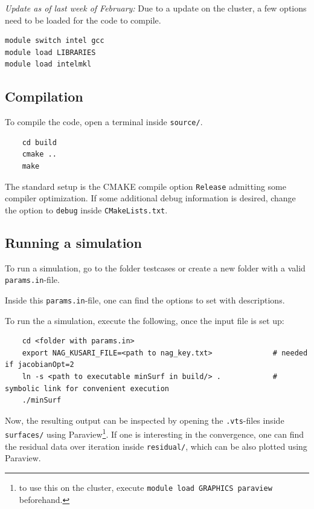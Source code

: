 \documentclass[11pt]{scrartcl}
\begin{document}
\color{@darkred}
\emph{Update as of last week of February:} Due to a update on the cluster, a few options need to be loaded for the code to compile.
\begin{lstlisting}
module switch intel gcc 
module load LIBRARIES
module load intelmkl
\end{lstlisting}
\normalcolor

\subsection{Compilation}
To compile the code, open a terminal inside \texttt{source/}. 
\begin{lstlisting}
	cd build 
	cmake .. 
	make
\end{lstlisting}
The standard setup is the CMAKE compile option \texttt{Release} admitting some compiler optimization. If some additional debug information is desired, change the option to \texttt{debug} inside \texttt{CMakeLists.txt}.
\subsection{Running a simulation}
To run a simulation, go to the folder testcases or create a new folder with a valid \texttt{params.in}-file.

Inside this \texttt{params.in}-file, one can find the options to set with descriptions.

\noindent To run the a simulation, execute the following, once the input file is set up:
\begin{lstlisting}
	cd <folder with params.in> 
	export NAG_KUSARI_FILE=<path to nag_key.txt>              # needed if jacobianOpt=2 
	ln -s <path to executable minSurf in build/> .            # symbolic link for convenient execution 
	./minSurf
\end{lstlisting}
Now, the resulting output can be inspected by opening the \texttt{.vts}-files inside \texttt{surfaces/} using Paraview\footnote{to use this on the cluster, execute \texttt{module load GRAPHICS paraview} beforehand.}. If one is interesting in the convergence, one can find the residual data over iteration inside \texttt{residual/}, which can be also plotted using Paraview. 
\end{document}
